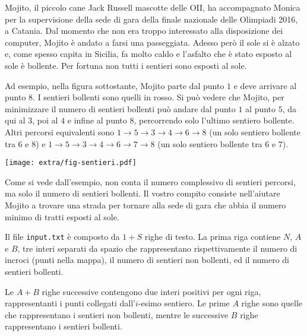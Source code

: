 \usepackage{xcolor}
\usepackage{afterpage}
\usepackage{pifont,mdframed}
\usepackage[bottom,symbol]{footmisc}


\newcommand{\inputfile}{\texttt{input.txt}}
\newcommand{\outputfile}{\texttt{output.txt}}


Mojito, il piccolo cane Jack Russell mascotte delle OII, ha accompagnato Monica per la supervisione della sede di gara della finale nazionale delle Olimpiadi 2016, a Catania. Dal momento che non era troppo interessato alla disposizione dei computer, Mojito è andato a farsi una passeggiata. Adesso però il sole si è alzato e, come spesso capita in Sicilia, fa molto caldo e l'asfalto che è stato esposto al sole è bollente. Per fortuna non tutti i sentieri sono esposti al sole.

Ad esempio, nella figura sottostante, Mojito parte dal punto $1$ e deve arrivare al punto $8$. I sentieri bollenti sono quelli in rosso. Si può vedere che Mojito, per minimizzare il numero di sentieri bollenti può andare dal punto $1$ al punto $5$, da qui al $3$, poi al $4$ e infine al punto $8$, percorrendo solo l'ultimo sentiero bollente. Altri percorsi equivalenti sono $1 \to 5 \to 3 \to 4 \to 6 \to 8$ (un solo sentiero bollente tra $6$ e $8$) e $1 \to 5 \to 3 \to 4 \to 6 \to 7 \to 8$ (un solo sentiero bollente tra $6$ e $7$).

\begin{center}
  \texttt{[image: extra/fig-sentieri.pdf]}
\end{center}

Come si vede dall'esempio, non conta il numero complessivo di sentieri percorsi, ma solo il numero di sentieri bollenti. Il vostro compito consiste nell'aiutare Mojito a trovare una strada per tornare alla sede di gara che abbia il numero minimo di tratti esposti al sole. 

\Input
Il file \inputfile{} è composto da $1+S$ righe di testo. La prima riga contiene $N$, $A$ e $B$, tre interi separati da spazio che rappresentano rispettivamente il numero di incroci (punti nella mappa), il numero di sentieri non bollenti, ed il numero di sentieri bollenti.

Le $A+B$ righe successive contengono due interi positivi per ogni riga, rappresentanti i punti collegati dall'$i$-esimo sentiero. Le prime $A$ righe sono quelle che rappresentano i sentieri non bollenti, mentre le successive $B$ righe rappresentano i sentieri bollenti. 

